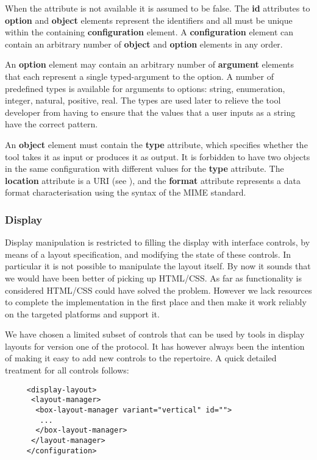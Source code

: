 \documentclass{article}
\begin{document}
   \noindent When the  attribute is not available it is assumed to
   be false. The \textbf{id} attributes to \textbf{option} and \textbf{object}
   elements represent the identifiers and all must be unique within the
   containing \textbf{configuration} element.  A \textbf{configuration} element
   can contain an arbitrary number of \textbf{object} and \textbf{option}
   elements in any order.

   An \textbf{option} element may contain an arbitrary number of
   \textbf{argument} elements that each represent a single typed-argument to the
   option. A number of predefined types is available for arguments to options:
   string, enumeration, integer, natural, positive, real. The types are used
   later to relieve the tool developer from having to ensure that the values that
   a user inputs as a string have the correct pattern.

   An \textbf{object} element must contain the \textbf{type} attribute, which
   specifies whether the tool takes it as input or produces it as output. It is
   forbidden to have two objects in the same configuration with different
   values for the \textbf{type} attribute. The \textbf{location} attribute is a
   URI (see \cite{rfc3305}), and the \textbf{format} attribute represents a data format
   characterisation using the syntax of the MIME standard.

  \subsubsection{Display}
   
   Display manipulation is restricted to filling the display with interface
   controls, by means of a layout specification, and modifying the state of
   these controls. In particular it is not possible to manipulate the layout
   itself. By now it sounds that we would have been better of picking up
   HTML/CSS. As far as functionality is considered HTML/CSS could have solved
   the problem. However we lack resources to complete the implementation in the
   first place and then make it work reliably on the targeted platforms and
   support it.

   We have chosen a limited subset of controls that can be used by tools in
   display layouts for version one of the protocol. It has however always been
   the intention of making it easy to add new controls to the repertoire. A
   quick detailed treatment for all controls follows:

    \begin{verbatim}
     <display-layout>
      <layout-manager>
       <box-layout-manager variant="vertical" id="">
        ...
       </box-layout-manager>
      </layout-manager>
     </configuration>\end{verbatim}
\end{document}
